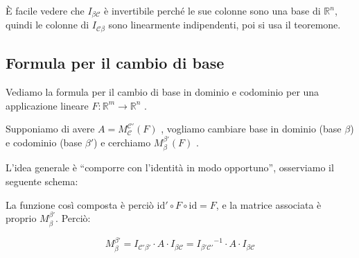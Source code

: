 \documentclass[
  a4paper,
]{article}
\begin{document}
\begin{notebox}
È facile vedere che \(I_{\beta \mathcal{C}}\) è invertibile perché le
sue colonne sono una base di \(\mathbb{R}^n\), quindi le colonne di
\(I_{\mathcal{C} \beta}\) sono linearmente indipendenti, poi si usa il
teoremone.
\end{notebox}

\hypertarget{formula-per-il-cambio-di-base}{%
\subsection{Formula per il cambio di
base}\label{formula-per-il-cambio-di-base}}

Vediamo la formula per il cambio di base in dominio e codominio per una
applicazione lineare \(F: \mathbb{R}^m \to \mathbb{R}^n\) .

\bigskip

Supponiamo di avere \(A = M^{\mathcal{C'}}_{\mathcal{C}}(F)\) , vogliamo
cambiare base in dominio (base \(\beta\)) e codominio (base \(\beta '\))
e cerchiamo \(M^{\beta'}_{\beta}(F)\) .

L'idea generale è ``comporre con l'identità in modo opportuno'',
osserviamo il seguente schema:

\begin{observationbox}
\begin{center}
\end{center}
\end{observationbox}

La funzione così composta è perciò
\(\mathrm{id'} \circ F \circ \mathrm{id} = F\), e la matrice associata è
proprio \(M_{\beta}^{\beta'}\). Perciò:

\begin{propositionbox}
\[
M_{\beta}^{\beta'} = I_{\mathcal{C}' \beta'}\cdot A \cdot I_{\beta\mathcal{C}} = {I_{\beta' \mathcal{C}'}}^{-1}\cdot A \cdot I_{\beta\mathcal{C}}
\]
\end{propositionbox}
\end{document}
